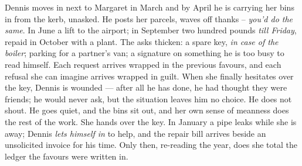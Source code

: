 

\begin{story}
Dennis moves in next to Margaret in March and by April he is carrying her bins in from the kerb, unasked. He posts her parcels, waves off thanks -- \emph{you'd do the same}. In June a lift to the airport; in September two hundred pounds \emph{till Friday}, repaid in October with a plant. The asks thicken: a spare key, \emph{in case of the boiler}; parking for a partner's van; a signature on something he is too busy to read himself. Each request arrives wrapped in the previous favours, and each refusal she can imagine arrives wrapped in guilt. When she finally hesitates over the key, Dennis is wounded --- after all he has done, he had thought they were friends; he would never ask, but the situation leaves him no choice. He does not shout. He goes quiet, and the bins sit out, and her own sense of meanness does the rest of the work. She hands over the key. In January a pipe leaks while she is away; Dennis \emph{lets himself in} to help, and the repair bill arrives beside an unsolicited invoice for his time. Only then, re-reading the year, does she total the ledger the favours were written in.
\end{story}

